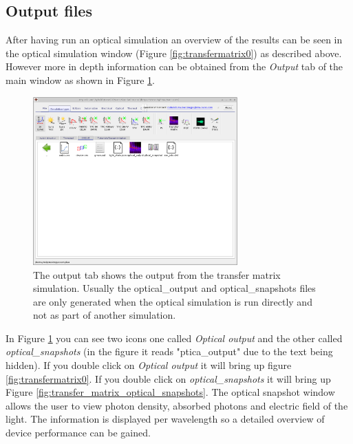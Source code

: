 \subsection{Output files}
After having run an optical simulation an overview of the results can be seen in the optical simulation window (Figure \ref{fig:transfermatrix0}) as described above. However more in depth information can be obtained from the \emph{Output} tab of the main window as shown in Figure \ref{fig:transfer_matrix_optical_output}.

\begin{figure}[H]
\centering
\includegraphics[height=0.6\textwidth,width=0.7\textwidth]{./images/transfer_matrix/optical_output.png}
\caption{The output tab shows the output from the transfer matrix simulation. Usually the optical\_output and optical\_snapshots files are only generated when the optical simulation is run directly and not as part of another simulation.}
\label{fig:transfer_matrix_optical_output}
\end{figure}

In Figure \ref{fig:transfer_matrix_optical_output} you can see two icons one called \emph{Optical output} and the other called \emph{optical\_snapshots} (in the figure it reads "ptica\_output" due to the text being hidden). If you double click on \emph{Optical output} it will bring up figure \ref{fig:transfermatrix0}. If you double click on \emph{optical\_snapshots} it will bring up Figure \ref{fig:transfer_matrix_optical_snapshots}. The optical snapshot window allows the user to view photon density, absorbed photons and electric field of the light. The information is displayed per wavelength so a detailed overview of device performance can be gained.


